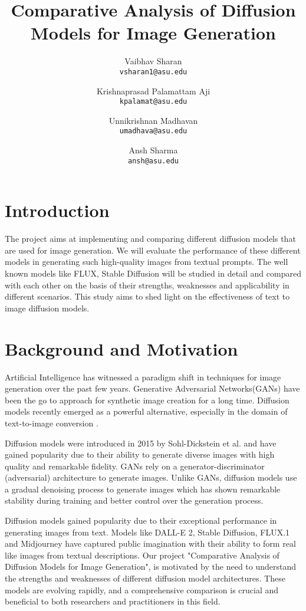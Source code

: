 \documentclass{article}
\title{Comparative Analysis of Diffusion Models for Image Generation
}
\author{
  Vaibhav Sharan\\
  \texttt{vsharan1@asu.edu} \\ 
  \and
  Krishnaprasad Palamattam Aji\\
  \texttt{kpalamat@asu.edu}\\
  \and
  Unnikrishnan Madhavan\\
  \texttt{umadhava@asu.edu}\\
  \and
  Ansh Sharma\\
  \texttt{ansh@asu.edu}
}
\begin{document}
\maketitle

\section{Introduction}
The project aims at implementing and comparing different diffusion models that are used for 
image generation. We will evaluate the performance of these different models in generating
such high-quality images from textual prompts. The well known models like FLUX, Stable
Diffusion will be studied in detail and compared with each other on the basis of
their strengths, weaknesses and applicability in different scenarios. This study aims to shed light
on the effectiveness of text to image diffusion models.


\section{Background and Motivation}
Artificial Intelligence has witnessed a paradigm shift in techniques for image generation over the past few years. 
Generative Adversarial Networks(GANs) have been the go to approach for synthetic image creation for a long time. 
Diffusion models recently emerged as a powerful alternative, especially in the domain of text-to-image conversion \cite{dhariwal2021}. 

Diffusion models were introduced in 2015 by Sohl-Dickstein et al.\cite{sohl2015} and have gained popularity 
due to their ability to generate diverse images with high quality and remarkable fidelity. GANs rely on a 
generator-discriminator (adversarial) architecture to generate images. Unlike GANs, diffusion models use a 
gradual denoising process to generate images which has shown remarkable stability during training and better control
over the generation process.

Diffusion models gained popularity due to their exceptional performance in generating images from text. Models like DALL-E 2,
Stable Diffusion, FLUX.1 and Midjourney have captured public imagination with their ability to form real like images 
from textual descriptions. Our project "Comparative Analysis of Diffusion Models for Image Generation", is motivated by the 
need to understand the strengths and weaknesses of different diffusion model architectures. These models are evolving rapidly, and a 
comprehensive comparison is crucial and beneficial to both researchers and practitioners in this field.
\end{document}
